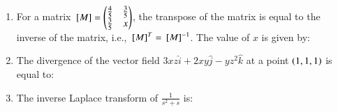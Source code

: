 \documentclass[journal]{IEEEtran}
\begin{document}
\begin{enumerate}[leftmargin=0pt]
    


        

\item For a matrix ${}\left[M\right]=\begin{pmatrix} \frac{4}{5} & \frac{3}{5} \\ \frac{3}{5} & x \end{pmatrix}$, the transpose of the matrix is equal to the inverse of the matrix, i.e., ${}\left[M\right]^T={}\left[M\right]^{-1}$. The value of $x$ is given by:
  \begin{enumerate}
  \end{enumerate}
  \hfill{}


\item The divergence of the vector field $3 x z \hat{i} + 2 x y \hat{j} - y z^{2} \hat{k}$ at a point $\left(1,1,1\right)$ is equal to:
  \begin{enumerate}
        
  \end{enumerate}
  \hfill{}

\item The inverse Laplace transform of $\frac{1}{s^{2} + s}$ is:
  \begin{enumerate}
  \end{enumerate}
  \hfill{}


\end{enumerate}
\end{document}
